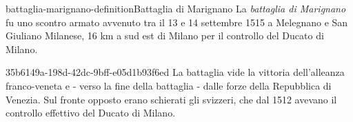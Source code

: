 \documentclass[preview]{standalone}
\begin{document}

\begin{snippetdefinition}{battaglia-marignano-definition}{Battaglia di Marignano}
    La \textit{battaglia di Marignano} fu uno scontro armato avvenuto tra il 13 e 14
    settembre 1515 a Melegnano e San Giuliano Milanese,
    16 km a sud est di Milano per il controllo del Ducato di Milano. 
\end{snippetdefinition}

\begin{snippet}{35b6149a-198d-42dc-9bff-e05d1b93f6ed}
    La battaglia vide la vittoria dell'alleanza franco-veneta
    e - verso la fine della battaglia - dalle forze della Repubblica di Venezia.
    Sul fronte opposto erano schierati gli svizzeri, che dal 1512 avevano il controllo
    effettivo del Ducato di Milano.
\end{snippet}

\end{document}
